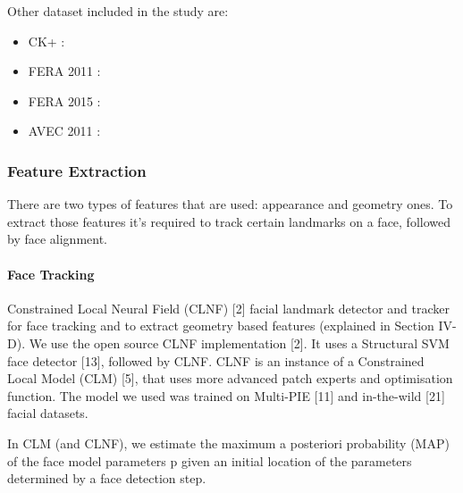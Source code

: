 Other dataset included in the study are:
\begin{itemize}[noitemsep]
	\item CK+ \cite{CK+}:
	\item FERA 2011 \cite{FERA11}:
	\item FERA 2015 \cite{FERA15}:
	\item AVEC 2011 \cite{AVEC11}:
\end{itemize}



\subsubsection{Feature Extraction}
There are two types of features that are used: appearance and geometry ones. To extract those features it's required to track certain landmarks on a face, followed by face alignment.

\paragraph{Face Tracking}
Constrained Local Neural Field (CLNF) [2] facial landmark detector and tracker for face tracking and to extract geometry based features (explained in Section IV-D). We use the open source CLNF implementation [2]. It uses a Structural SVM face detector [13], followed by CLNF.
CLNF is an instance of a Constrained Local Model (CLM) [5], that uses more advanced patch experts and optimisation function. The model we used was trained on Multi-PIE [11] and in-the-wild [21] facial datasets.



In CLM (and CLNF), we estimate the maximum a posteriori probability (MAP) of the face model parameters p given an initial location of the parameters determined by a face detection step.


